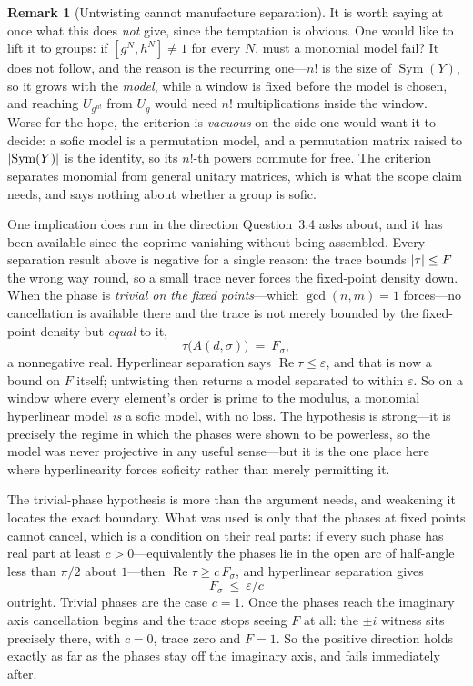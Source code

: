 \documentclass[11pt]{amsart}
\theoremstyle{definition}
\newtheorem{remark}[theorem]{Remark}
\theoremstyle{plain}
\newcommand{\Sym}{\operatorname{Sym}}
\newcommand{\eps}{\varepsilon}
\DeclarePairedDelimiter{\abs}{\lvert}{\rvert}
\begin{document}
\begin{remark}[Untwisting cannot manufacture separation]
It is worth saying at once what this does \emph{not} give, since the temptation is obvious.  One would like to lift it to groups: if \([g^N,h^N]\neq1\) for every \(N\), must a monomial model fail?  It does not follow, and the reason is the recurring one---\(n!\) is the size of \(\Sym(Y)\), so it grows with the \emph{model}, while a window is fixed before the model is chosen, and reaching \(U_{g^{n!}}\) from \(U_g\) would need \(n!\) multiplications inside the window.  Worse for the hope, the criterion is \emph{vacuous} on the side one would want it to decide: a sofic model is a permutation model, and a permutation matrix raised to \(\abs{\Sym(Y)}\) is the identity, so its \(n!\)-th powers commute for free.  The criterion separates monomial from general unitary matrices, which is what the scope claim needs, and says nothing about whether a group is sofic.

One implication does run in the direction Question~3.4 asks about, and it has been available since the coprime vanishing without being assembled.  Every separation result above is negative for a single reason: the trace bounds \(\abs\tau\leq F\) the wrong way round, so a small trace never forces the fixed-point density down.  When the phase is \emph{trivial on the fixed points}---which \(\gcd(n,m)=1\) forces---no cancellation is available there and the trace is not merely bounded by the fixed-point density but \emph{equal} to it,
\[
 \tau\bigl(A(d,\sigma)\bigr)\ =\ F_\sigma ,
\]
a nonnegative real.  Hyperlinear separation says \(\operatorname{Re}\tau\leq\eps\), and that is now a bound on \(F\) itself; untwisting then returns a model separated to within \(\eps\).  So on a window where every element's order is prime to the modulus, a monomial hyperlinear model \emph{is} a sofic model, with no loss.  The hypothesis is strong---it is precisely the regime in which the phases were shown to be powerless, so the model was never projective in any useful sense---but it is the one place here where hyperlinearity forces soficity rather than merely permitting it.

The trivial-phase hypothesis is more than the argument needs, and weakening it locates the exact boundary.  What was used is only that the phases at fixed points cannot cancel, which is a condition on their real parts: if every such phase has real part at least \(c>0\)---equivalently the phases lie in the open arc of half-angle less than \(\pi/2\) about \(1\)---then \(\operatorname{Re}\tau\geq c\,F_\sigma\), and hyperlinear separation gives
\[
 F_\sigma\ \leq\ \eps/c
\]
outright.  Trivial phases are the case \(c=1\).  Once the phases reach the imaginary axis cancellation begins and the trace stops seeing \(F\) at all: the \(\pm i\) witness sits precisely there, with \(c=0\), trace zero and \(F=1\).  So the positive direction holds exactly as far as the phases stay off the imaginary axis, and fails immediately after.


\end{remark}
\end{document}
